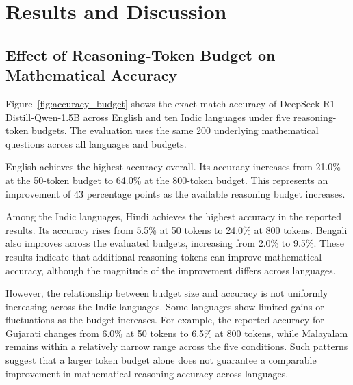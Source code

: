 \documentclass[11pt]{article}
\begin{document}




\section{Results and Discussion}
\label{sec:results}

\subsection{Effect of Reasoning-Token Budget on Mathematical Accuracy}

Figure~\ref{fig:accuracy_budget} shows the exact-match accuracy of DeepSeek-R1-Distill-Qwen-1.5B across English and ten Indic languages under five reasoning-token budgets. The evaluation uses the same 200 underlying mathematical questions across all languages and budgets.

English achieves the highest accuracy overall. Its accuracy increases from 21.0\% at the 50-token budget to 64.0\% at the 800-token budget. This represents an improvement of 43 percentage points as the available reasoning budget increases.

Among the Indic languages, Hindi achieves the highest accuracy in the reported results. Its accuracy rises from 5.5\% at 50 tokens to 24.0\% at 800 tokens. Bengali also improves across the evaluated budgets, increasing from 2.0\% to 9.5\%. These results indicate that additional reasoning tokens can improve mathematical accuracy, although the magnitude of the improvement differs across languages.

However, the relationship between budget size and accuracy is not uniformly increasing across the Indic languages. Some languages show limited gains or fluctuations as the budget increases. For example, the reported accuracy for Gujarati changes from 6.0\% at 50 tokens to 6.5\% at 800 tokens, while Malayalam remains within a relatively narrow range across the five conditions. Such patterns suggest that a larger token budget alone does not guarantee a comparable improvement in mathematical reasoning accuracy across languages.
\end{document}
